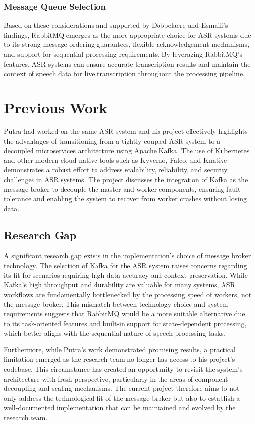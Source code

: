 \subsubsection{Message Queue Selection} \label{subsection:research_gap}
Based on these considerations and supported by Dobbelaere and Esmaili's \cite{kafka_v_rabbitmq} findings, RabbitMQ emerges as the more appropriate choice for ASR systems due to its strong message ordering guarantees, flexible acknowledgement mechanisms, and support for sequential processing requirements. By leveraging RabbitMQ's features, ASR systems can ensure accurate transcription results and maintain the context of speech data for live transcription throughout the processing pipeline.



\section{Previous Work}
Putra \cite{putra} had worked on the same ASR system and his project effectively highlights the advantages of transitioning from a tightly coupled ASR system to a decoupled microservices architecture using Apache Kafka. The use of Kubernetes and other modern cloud-native tools such as Kyverno, Falco, and Knative demonstrates a robust effort to address scalability, reliability, and security challenges in ASR systems. The project discusses the integration of Kafka as the message broker to decouple the master and worker components, ensuring fault tolerance and enabling the system to recover from worker crashes without losing data.

\subsection{Research Gap}
A significant research gap exists in the implementation's choice of message broker technology. The selection of Kafka for the ASR system raises concerns regarding its fit for scenarios requiring high data accuracy and context preservation. While Kafka's high throughput and durability are valuable for many systems, ASR workflows are fundamentally bottlenecked by the processing speed of workers, not the message broker. This mismatch between technology choice and system requirements suggests that RabbitMQ would be a more suitable alternative due to its task-oriented features and built-in support for state-dependent processing, which better aligns with the sequential nature of speech processing tasks.

Furthermore, while Putra’s work \cite{putra} demonstrated promising results, a practical limitation emerged as the research team no longer has access to his project's codebase. This circumstance has created an opportunity to revisit the system's architecture with fresh perspective, particularly in the areas of component decoupling and scaling mechanisms. The current project therefore aims to not only address the technological fit of the message broker but also to establish a well-documented implementation that can be maintained and evolved by the research team.

